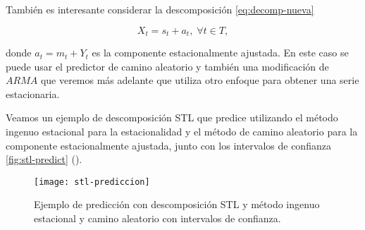 También es interesante considerar la descomposición \eqref{eq:decomp-nueva}

\begin{equation}
  X_t = s_t + a_t, \; \forall t \in T,
  \label{eq:decomp-nueva}
\end{equation}

donde $a_t = m_t + Y_t$ es la componente estacionalmente ajustada. En este caso se puede usar el predictor de camino aleatorio y también una modificación de $ARMA$ que veremos más adelante que utiliza otro enfoque para obtener una serie estacionaria.

Veamos un ejemplo de descomposición STL que predice utilizando el método ingenuo estacional para la estacionalidad y el método de camino aleatorio para la componente estacionalmente ajustada, junto con los intervalos de confianza \autoref{fig:stl-predict} (\cite{hyndman2018forecasting}).

\begin{figure}[htpb]
  \centering
  \texttt{[image: stl-prediccion]}
  \caption{Ejemplo de predicción con descomposición STL y método ingenuo estacional y camino aleatorio con intervalos de confianza.}
  \label{fig:stl-predict}
\end{figure}


\endinput
